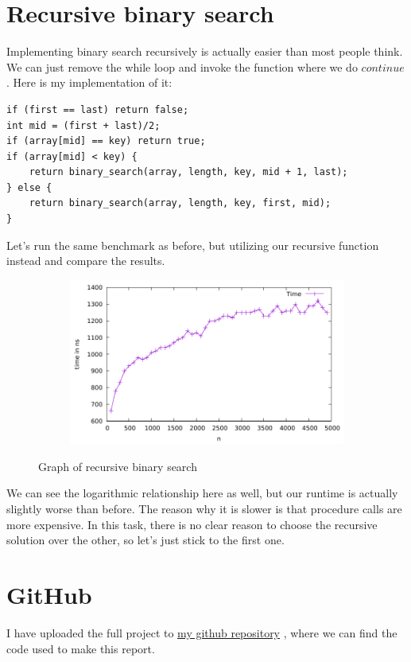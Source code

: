\documentclass[a4paper,11pt]{article}
\newcommand{\underlinehref}[2]{%
    \href{#1}{\ul{#2}}%
}
\begin{document}
    \section*{Recursive binary search}

    Implementing binary search recursively is actually easier than most people think.
    We can just remove the while loop and invoke the function where we do $continue$.
    Here is my implementation of it:

    \begin{verbatim}
if (first == last) return false;
int mid = (first + last)/2;
if (array[mid] == key) return true;
if (array[mid] < key) {
    return binary_search(array, length, key, mid + 1, last);
} else {
    return binary_search(array, length, key, first, mid);
}
    \end{verbatim}

    Let's run the same benchmark as before, but utilizing our recursive function instead and compare the results.

    \begin{figure}[h]
        \centering
        \begin{subfigure}[b]{.5\textwidth}
            \centering
            \includegraphics[width=\textwidth]{./binary_recursive/data} %
        \end{subfigure}
        \caption{Graph of recursive binary search}
        \label{fig:graph_4}
    \end{figure}

    We can see the logarithmic relationship here as well, but our runtime is actually slightly worse than before.
    The reason why it is slower is that procedure calls are more expensive.
    In this task, there is no clear reason to choose the recursive solution over the other, so let's just stick to the first one.

    \section*{GitHub}
    I have uploaded the full project to \underlinehref{https://github.com/peterherczku/ID1021/tree/main/assignment-3}{my github repository}, where we can find the code used to make this report.
\end{document}
